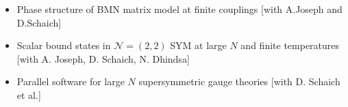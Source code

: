 \renewcommand{\arraystretch}{1.1}

	\begin{itemize}
	 \item Phase structure of BMN matrix model at finite couplings [with A.Joseph and D.Schaich] 
	 \item Scalar bound states in $\mathcal{N}=(2,2)$ SYM at large $N$ and finite temperatures [with A. Joseph, D. Schaich, N. Dhindsa] 
	 \item Parallel software for large $N$ supersymmetric gauge theories [with D. Schaich et al.] 
	  \end{itemize}
